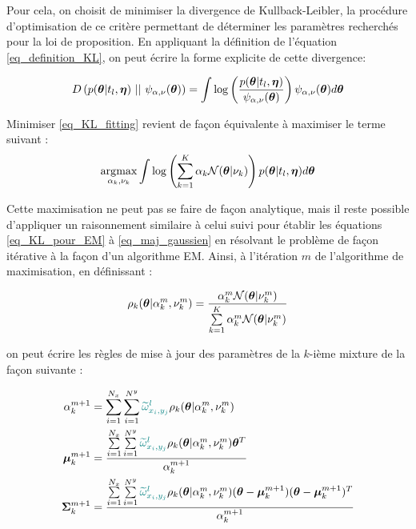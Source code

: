 Pour cela, on choisit de minimiser la divergence de Kullback-Leibler, la procédure d'optimisation de ce critère permettant de déterminer les paramètres recherchés pour la loi de proposition. En appliquant la définition de l'équation \eqref{eq_definition_KL}, on peut écrire la forme explicite de cette divergence: 

\begin{equation}
D\left(p({\bm{\theta}}|t_l,{\bm{\eta}}) ~ || ~ \psi_{\alpha, \nu}({\bm{\theta}})\right) = \int \log \left(\dfrac{p({\bm{\theta}}|t_l,{\bm{\eta}})}{ \psi_{\alpha, \nu}({\bm{\theta}})}\right) \psi_{\alpha, \nu}({\bm{\theta}}) d{\bm{\theta}}
\label{eq_KL_fitting}
\end{equation}

Minimiser \eqref{eq_KL_fitting} revient de façon équivalente à maximiser le terme suivant : 
\begin{equation}
\operatorname*{\arg\!\max}_{\alpha_k, \nu_k} \int \log \left(\sum\limits_{k=1}^K \alpha_k \mathcal{N}({\bm{\theta}} | \nu_k) \right)p({\bm{\theta}}|t_l,{\bm{\eta}}) d{\bm{\theta}}
\end{equation}

Cette maximisation ne peut pas se faire de façon analytique, mais il reste possible d'appliquer un raisonnement similaire à celui suivi pour établir les équations \eqref{eq_KL_pour_EM} à  \eqref{eq_maj_gaussien} en résolvant le problème de façon itérative à la façon d'un algorithme EM. Ainsi, à l'itération $m$ de l'algorithme de maximisation, en définissant : 

\begin{equation}
\rho_k ({\bm{\theta}} | \alpha_k^m,\nu_k^m) = \dfrac{\alpha_k^m \mathcal{N}({\bm{\theta}}|\nu_k^m)}{\sum\limits_{k=1}^K \alpha_k^m \mathcal{N}({\bm{\theta}}|\nu_k^m)}
\end{equation}

on peut écrire les règles de mise à jour des paramètres de la $k$-ième mixture de la façon suivante : 

\begin{equation}
\begin{split}
\alpha_k^{m+1} &= \sum\limits_{i=1}^{N_x} \sum\limits_{i=1}^{N^y} \NdFS{\widetilde{\omega}_{x_i, y_j}^l} \rho_k (\VecTheta | \alpha_k^m,\nu_k^m) \\
\VecMu_k^{m+1} &= \dfrac{\sum\limits_{i=1}^{N_x} \sum\limits_{i=1}^{N^y} \NdFS{\widetilde{\omega}_{x_i,y_j}^l} \rho_k (\VecTheta | \alpha_k^m,\nu_k^m) \VecTheta^T}{\alpha_k^{m+1}} \\
\MatSigma_k^{m+1} &= \dfrac{\sum\limits_{i=1}^{N_x} \sum\limits_{i=1}^{N^y} \NdFS{\widetilde{\omega}_{x_i,y_j}^l} \rho_k (\VecTheta | \alpha_k^m,\nu_k^m) (\VecTheta - \VecMu_k^{m+1} )(\VecTheta - \VecMu_k^{m+1} )^T}{\alpha_k^{m+1}}
\end{split}
\end{equation}


